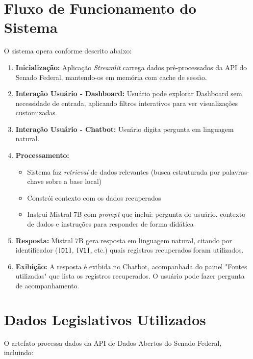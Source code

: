 \section{Fluxo de Funcionamento do Sistema}

O sistema opera conforme descrito abaixo:

\begin{enumerate}
    \item \textbf{Inicialização:} Aplicação \textit{Streamlit} carrega dados pré-processados da API do Senado Federal, mantendo-os em memória com cache de sessão.

    \item \textbf{Interação Usuário - Dashboard:} Usuário pode explorar Dashboard sem necessidade de entrada, aplicando filtros interativos para ver visualizações customizadas.

    \item \textbf{Interação Usuário - Chatbot:} Usuário digita pergunta em linguagem natural.

    \item \textbf{Processamento:}
    \begin{itemize}
        \item Sistema faz \textit{retrieval} de dados relevantes (busca estruturada por palavras-chave sobre a base local)
        \item Constrói contexto com os dados recuperados
        \item Instrui Mistral 7B com \textit{prompt} que inclui: pergunta do usuário, contexto de dados e instruções para responder de forma didática
    \end{itemize}

    \item \textbf{Resposta:} Mistral 7B gera resposta em linguagem natural, citando por identificador (\texttt{[D1]}, \texttt{[V1]}, etc.) quais registros recuperados foram utilizados.

    \item \textbf{Exibição:} A resposta é exibida no Chatbot, acompanhada do painel "Fontes utilizadas" que lista os registros recuperados. O usuário pode fazer pergunta de acompanhamento.
\end{enumerate}

\section{Dados Legislativos Utilizados}

O artefato processa dados da API de Dados Abertos do Senado Federal, incluindo:

